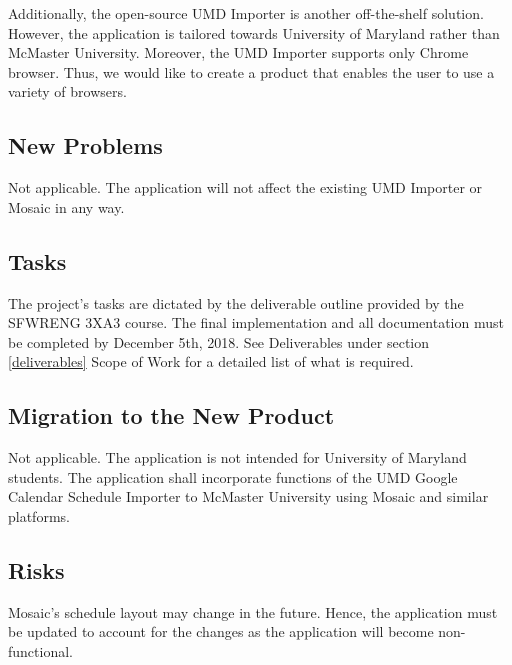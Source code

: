 \documentclass[12pt, titlepage]{article}
\begin{document}
\color{blue}
Additionally, the open-source UMD Importer is another off-the-shelf solution. However, the application is tailored towards University of Maryland rather than McMaster University. Moreover, the UMD Importer supports only Chrome browser. Thus, we would like to create a product that enables the user to use a variety of browsers.
\color{black}
\subsection{New Problems}
\hspace{5mm}
Not applicable. The application will not affect the existing UMD Importer or Mosaic in any way.
\subsection{Tasks}
\hspace{5mm}
The project's tasks are dictated by the deliverable outline provided by the SFWRENG 3XA3 course. The final implementation and all documentation must be completed by December 5th, 2018. See Deliverables under section \ref{deliverables} Scope of Work for a detailed list of what is required.
\subsection{Migration to the New Product}
\hspace{5mm}Not applicable. The application is not intended for University of Maryland students. The application shall incorporate functions of the UMD Google Calendar Schedule Importer to McMaster University using Mosaic and similar platforms. 
\subsection{Risks}
\hspace{5mm}
Mosaic's schedule layout may change in the future. Hence, the application must be updated to account for the changes as the application will become non-functional.
\end{document}
